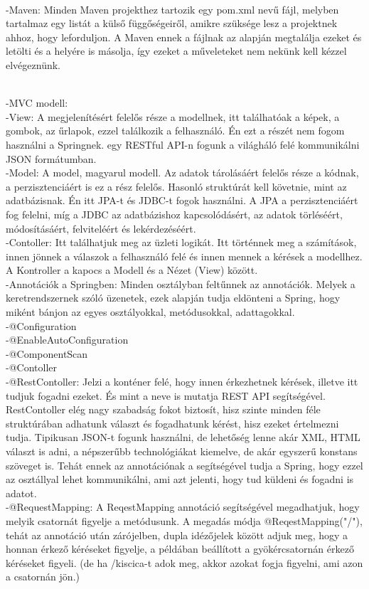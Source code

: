 \documentclass[11pt]{article}
\begin{document}
\\ -Maven: Minden Maven projekthez tartozik egy pom.xml nevű fájl, melyben tartalmaz egy listát a külső függőségeiről, amikre szüksége lesz a projektnek ahhoz, hogy leforduljon. A Maven ennek a fájlnak az alapján megtalálja ezeket és letölti és a helyére is másolja, így ezeket a műveleteket nem nekünk kell kézzel elvégeznünk.

\\ -MVC modell:
\\ -View: A megjelenítésért felelős része a modellnek, itt találhatóak a képek, a gombok, az űrlapok, ezzel találkozik a felhasználó. Én ezt a részét nem fogom használni a Springnek. egy RESTful API-n fogunk a világháló felé kommunikálni JSON formátumban.
\\ -Model: A model, magyarul modell. Az adatok tárolásáért felelős része a kódnak, a perzisztenciáért is ez a rész felelős. Hasonló struktúrát kell követnie, mint az adatbázisnak. Én itt JPA-t és JDBC-t fogok használni. A JPA a perzisztenciáért fog felelni, míg a JDBC az adatbázishoz kapcsolódásért, az adatok törléséért, módosításáért, felviteléért és lekérdezéséért.
\\ -Contoller: Itt találhatjuk meg az üzleti logikát. Itt történnek meg a számítások, innen jönnek a válaszok a felhasználó felé és innen mennek a kérések a modellhez. A Kontroller a kapocs a Modell és a Nézet (View) között.
\\ -Annotációk a Springben: Minden osztályban feltűnnek az annotációk. Melyek a keretrendszernek szóló üzenetek, ezek alapján tudja eldönteni a Spring, hogy miként bánjon az egyes osztályokkal, metódusokkal, adattagokkal.
\\ -@Configuration
\\ -@EnableAutoConfiguration
\\ -@ComponentScan
\\ -@Contoller
\\ -@RestContoller: Jelzi a konténer felé, hogy innen érkezhetnek kérések, illetve itt tudjuk fogadni ezeket. És mint a neve is mutatja REST API segítségével. RestContoller elég nagy szabadság fokot biztosít, hisz szinte minden féle struktúrában adhatunk választ és fogadhatunk kérést, hisz ezeket értelmezni tudja. Tipikusan JSON-t fogunk használni, de lehetőség lenne akár XML, HTML választ is adni, a népszerűbb technológiákat kiemelve, de akár egyszerű konstans szöveget is. Tehát ennek az annotációnak a segítségével tudja a Spring, hogy ezzel az osztállyal lehet kommunikálni, ami azt jelenti, hogy tud küldeni és fogadni is adatot.
\\ -@RequestMapping: A ReqestMapping annotáció segítségével megadhatjuk, hogy melyik csatornát figyelje a metódusunk. A megadás módja @ReqestMapping("/"), tehát az annotáció után zárójelben, dupla idézőjelek között adjuk meg, hogy a honnan érkező kéréseket figyelje, a példában beállított a gyökércsatornán érkező kéréseket figyeli. (de ha /kiscica-t adok meg, akkor azokat fogja figyelni, ami azon a csatornán jön.)
\end{document}
